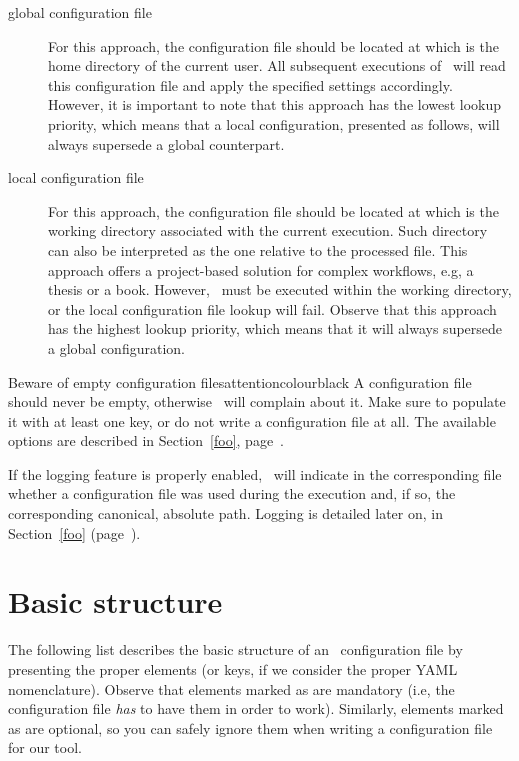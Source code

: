 \begin{description}
\item[global configuration file] For this approach, the configuration file should be located at  which is the home directory of the current user. All subsequent executions of \arara\ will read this configuration file and apply the specified settings accordingly. However, it is important to note that this approach has the lowest lookup priority, which means that a local configuration, presented as follows, will always supersede a global counterpart.

\item[local configuration file] For this approach, the configuration file should be located at  which is the working directory associated with the current execution. Such directory can also be interpreted as the one relative to the processed file. This approach offers a project-based solution for complex workflows, e.g, a thesis or a book. However, \arara\ must be executed within the working directory, or the local configuration file lookup will fail. Observe that this approach has the highest lookup priority, which means that it will always supersede a global configuration.
\end{description}

\begin{messagebox}{Beware of empty configuration files}{attentioncolour}{\icattention}{black}
A configuration file should never be empty, otherwise \arara\ will complain about it. Make sure to populate it with at least one key, or do not write a configuration file at all. The available options are described in Section~\ref{foo}, page~\pageref{foo}.
\end{messagebox}

If the logging feature is properly enabled, \arara\ will indicate in the corresponding  file whether a configuration file was used during the execution and, if so, the corresponding canonical, absolute path. Logging is detailed later on, in Section~\ref{foo} (page~\pageref{foo}).

\section{Basic structure}
\label{sec:basicstructure}

The following list describes the basic structure of an \arara\ configuration file by presenting the proper elements (or keys, if we consider the proper YAML nomenclature). Observe that elements marked as  are mandatory (i.e, the configuration file \emph{has} to have them in order to work). Similarly, elements marked as  are optional, so you can safely ignore them when writing a configuration file for our tool.

